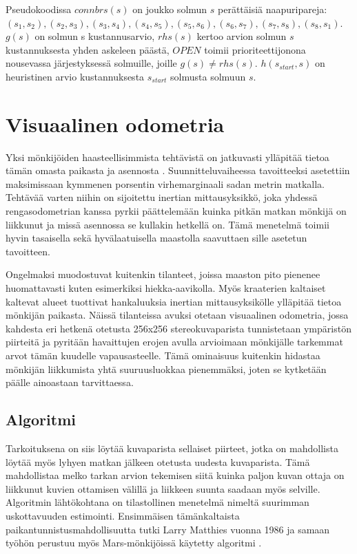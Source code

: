\documentclass[finnish]{tktltiki2}
\theoremstyle{definition}
\theoremstyle{remark}
\begin{document}
Pseudokoodissa $connbrs(s)$ on joukko solmun $s$ perättäisiä naapuripareja: ${(s_1,s_2), (s_2,s_3), (s_3,s_4),(s_4,s_5),(s_5,s_6),(s_6,s_7),(s_7,s_8),(s_8,s_1)}$. $g(s)$ on solmun s kustannusarvio, $rhs(s)$ kertoo arvion solmun $s$ kustannuksesta yhden askeleen päästä, $OPEN$ toimii prioriteettijonona nousevassa järjestyksessä solmuille, joille $g(s) \neq rhs(s)$. $h(s_{start}, s)$ on heuristinen arvio kustannuksesta $s_{start}$ solmusta solmuun $s$.

\section{Visuaalinen odometria}
Yksi mönkijöiden haasteellisimmista tehtävistä on jatkuvasti ylläpitää tietoa tämän omasta paikasta ja asennosta \cite{maimone2007two}. Suunnitteluvaiheessa tavoitteeksi asetettiin maksimissaan kymmenen porsentin virhemarginaali sadan metrin matkalla. Tehtävää varten niihin on sijoitettu inertian mittausyksikkö, joka yhdessä rengasodometrian kanssa pyrkii päättelemään kuinka pitkän matkan mönkijä on liikkunut ja missä asennossa se kullakin hetkellä on. Tämä menetelmä toimii hyvin tasaisella sekä hyvälaatuisella maastolla saavuttaen sille asetetun tavoitteen.

Ongelmaksi muodostuvat kuitenkin tilanteet, joissa maaston pito pienenee huomattavasti kuten esimerkiksi hiekka-aavikolla. Myös kraaterien kaltaiset kaltevat alueet tuottivat hankaluuksia inertian mittausyksikölle ylläpitää tietoa mönkijän paikasta. Näissä tilanteissa avuksi otetaan visuaalinen odometria, jossa kahdesta eri hetkenä otetusta 256x256 stereokuvaparista tunnistetaan ympäristön piirteitä ja pyritään havaittujen erojen avulla arvioimaan mönkijälle tarkemmat arvot tämän kuudelle vapausasteelle. Tämä ominaisuus kuitenkin hidastaa mönkijän liikkumista yhtä suuruusluokkaa pienemmäksi, joten se kytketään päälle ainoastaan tarvittaessa.

\subsection{Algoritmi}
Tarkoituksena on siis löytää kuvaparista sellaiset piirteet, jotka on mahdollista löytää myös lyhyen matkan jälkeen otetusta uudesta kuvaparista. Tämä mahdollistaa melko tarkan arvion tekemisen siitä kuinka paljon kuvan ottaja on liikkunut kuvien ottamisen välillä ja liikkeen suunta saadaan myös selville. Algoritmin lähtökohtana on tilastollinen menetelmä nimeltä suurimman uskottavuuden estimointi. Ensimmäisen tämänkaltaista paikantunnistusmahdollisuutta tutki Larry Matthies vuonna 1986 ja samaan työhön perustuu myös Mars-mönkijöissä käytetty algoritmi \cite{matthies}.
\end{document}
